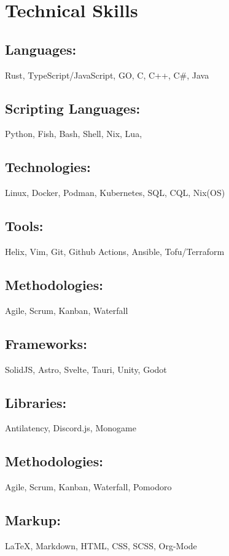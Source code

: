 \section{Technical Skills}

\subsection{Languages:} Rust, TypeScript/JavaScript, GO, C, C++, C\#, Java
\subsection{Scripting Languages:} Python, Fish, Bash, Shell, Nix, Lua, 
\subsection{Technologies:} Linux, Docker, Podman, Kubernetes, SQL, CQL, Nix(OS)
\subsection{Tools:} Helix, Vim, Git, Github Actions, Ansible, Tofu/Terraform
\subsection{Methodologies:} Agile, Scrum, Kanban, Waterfall
\subsection{Frameworks:} SolidJS, Astro, Svelte, Tauri, Unity, Godot
\subsection{Libraries:} Antilatency, Discord.js, Monogame
\subsection{Methodologies:} Agile, Scrum, Kanban, Waterfall, Pomodoro
\subsection{Markup:} {\LaTeX}, Markdown, HTML, CSS, SCSS, Org-Mode

